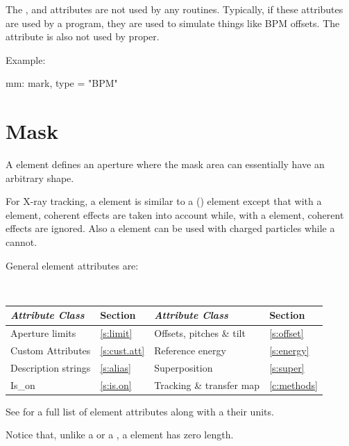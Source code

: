 {
The ,  and  attributes are not used
by any \bmad routines. Typically, if these attributes are used by a
program, they are used to simulate things like BPM offsets. The
 attribute is also not used by \bmad proper. 

Example:
\begin{example}
  mm: mark, type = "BPM"
\end{example}

\newpage

\section{Mask}
\label{s:mask}

A  element defines an aperture where the mask area can
essentially have an arbitrary shape. 

For X-ray tracking, a  element is similar to a
 () element except that with
a  element, coherent effects are taken into
account while, with a  element, coherent effects are ignored.
Also a  element can be used with charged particles while a
 cannot.

General  element attributes are:
\begin{center}
\tt 
\begin{tabular}{llll} \toprule
  {\sl Attribute Class}      & Section           & {\sl Attribute Class}      & Section         \\ \midrule
  Aperture limits            & \ref{s:limit}     & Offsets, pitches \& tilt   & \ref{s:offset}  \\
  Custom Attributes          & \ref{s:cust.att}  & Reference energy           & \ref{s:energy}  \\
  Description strings        & \ref{s:alias}     & Superposition              & \ref{s:super}   \\
  Is_on                      & \ref{s:is.on}     & Tracking \& transfer map   & \ref{c:methods} \\
  \bottomrule
\end{tabular}
\end{center}
\toffset
See  for a full list of element attributes along with a their units.

Notice that, unlike a  or a , a  element has zero length.

}
